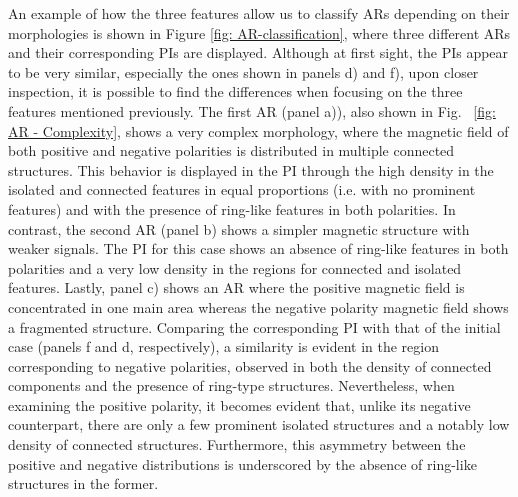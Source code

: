 An example of how the three features allow us to classify ARs depending on their morphologies is shown in Figure \ref{fig: AR-classification}, where three different ARs and their corresponding PIs are displayed. Although at first sight, the PIs appear to be very similar, especially the ones shown in panels d) and f), upon closer inspection, it is possible to find the differences when focusing on the three features mentioned previously. The first AR (panel a)), also shown in Fig. ~\ref{fig:  AR - Complexity}, shows a very complex morphology, where the magnetic field of both positive and negative polarities is distributed in multiple connected structures. This behavior is displayed in the PI through the high density in the isolated and connected features in equal proportions (i.e. with no prominent features) and with the presence of ring-like features in both polarities. In contrast, the second AR (panel b) shows a simpler magnetic structure with weaker signals. The PI for this case shows an absence of ring-like features in both polarities and a very low density in the regions for connected and isolated features. Lastly, panel c) shows an AR where the positive magnetic field is concentrated in one main area whereas the negative polarity magnetic field shows a fragmented structure. Comparing the corresponding PI with that of the initial case (panels f and d, respectively), a similarity is evident in the region corresponding to negative polarities, observed in both the density of connected components and the presence of ring-type structures. Nevertheless, when examining the positive polarity, it becomes evident that, unlike its negative counterpart, there are only a few prominent isolated structures and a notably low density of connected structures. Furthermore, this asymmetry between the positive and negative distributions is underscored by the absence of ring-like structures in the former.


